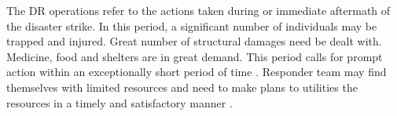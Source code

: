 The \ac{DR} operations refer to the actions taken during or immediate aftermath of the disaster strike. In this period, a significant number of individuals may be trapped and injured. Great number of structural damages need be dealt with. Medicine, food and shelters are in great demand. This period calls for prompt action within an exceptionally short period of time \cite{Wattegama2012}. Responder team may find themselves with limited resources and need to make plans to utilities the resources in a timely and satisfactory manner \cite{Chen2005,Chen2008}. \\



